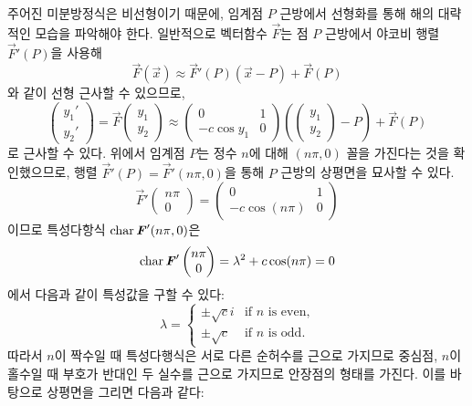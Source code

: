 \documentclass[../engineering_mathematics_lecture_note.tex]{subfiles}
\begin{document}
\begin{example}
    주어진 미분방정식은 비선형이기 때문에, 임계점 $P$ 근방에서 선형화를 통해 해의 대략적인 모습을 파악해야 한다.
    일반적으로 벡터함수 $\vec F$는 점 $P$ 근방에서 야코비 행렬 $\vec F'(P)$을 사용해
    \begin{equation*}
        \vec F(\vec x) \approx \vec F'(P) (\vec x - P) + \vec F(P)
    \end{equation*}
    와 같이 선형 근사할 수 있으므로,
    \begin{equation*}
        \begin{pmatrix}
            y_1' \\ y_2'
        \end{pmatrix} = \vec F \begin{pmatrix}
            y_1 \\ y_2
        \end{pmatrix} \approx \begin{pmatrix}
        0 & 1\\
        -c \cos y_1 & 0
    \end{pmatrix} \left( \begin{pmatrix}
        y_1 \\ y_2
    \end{pmatrix} - P \right) + \vec F(P)
    \end{equation*}
    로 근사할 수 있다.
    위에서 임계점 $P$는 정수 $n$에 대해 $(n \pi, 0)$ 꼴을 가진다는 것을 확인했으므로, 행렬 $\vec F'(P) = \vec F'(n \pi, 0)$을 통해 $P$ 근방의 상평면을 묘사할 수 있다.
    \begin{equation*}
        \vec F' \begin{pmatrix}
            n\pi \\ 0
        \end{pmatrix} = \begin{pmatrix}
        0 & 1 \\
        -c \cos (n \pi) & 0
        \end{pmatrix}
    \end{equation*}
    이므로 특성다항식 $\operatorname{char} \bm{\mathit{F}}'(n \pi, 0)$은
    \begin{equation*}
        \operatorname{char} \bm{\mathit{F}}' \begin{pmatrix}
            n\pi \\ 0
        \end{pmatrix} = \lambda^2 + c \cos (n \pi) = 0
    \end{equation*}
    에서 다음과 같이 특성값을 구할 수 있다:
    \begin{equation*}
        \lambda = \begin{cases}
            \pm \sqrt c i &\text{if $n$ is even,}\\
            \pm \sqrt c &\text{if $n$ is odd}.
        \end{cases}
    \end{equation*}
    따라서 $n$이 짝수일 때 특성다행식은 서로 다른 순허수를 근으로 가지므로 중심점, $n$이 홀수일 때 부호가 반대인 두 실수를 근으로 가지므로 안장점의 형태를 가진다.
    이를 바탕으로 상평면을 그리면 다음과 같다:\\
\end{example}
\end{document}
